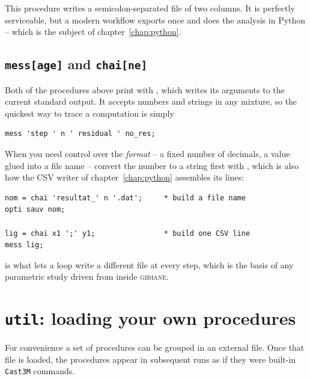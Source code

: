 \noindent This procedure writes a semicolon-separated file of two columns.
It is perfectly serviceable, but a modern workflow exports once and does the
analysis in Python -- which is the subject of chapter~\ref{chap:python}.

\subsection{\texttt{mess[age]} and \texttt{chai[ne]}}

Both of the procedures above print with 
, which writes its arguments
to the current standard output. It accepts numbers and strings in any mixture,
so the quickest way to trace a computation is simply

\begin{codebox}
\begin{verbatim}
mess 'step ' n ' residual ' no_res;
\end{verbatim}
\end{codebox}

\noindent When you need control over the \emph{format} -- a fixed number of
decimals, a value glued into a file name -- convert the number to a string
first with  , which
is also how the CSV writer of chapter~\ref{chap:python} assembles its lines:

\begin{codebox}
\begin{verbatim}
nom = chai 'resultat_' n '.dat';     * build a file name
opti sauv nom;

lig = chai x1 ';' y1;                * build one CSV line
mess lig;
\end{verbatim}
\end{codebox}

\noindent {} is what lets a loop write a different file at every step,
which is the basis of any parametric study driven from inside
\textsc{gibiane}.

\section{\texttt{util}: loading your own procedures}

For convenience a set of procedures can be grouped in an external file. Once
that file is loaded, the procedures appear in subsequent runs as if they were
built-in \texttt{Cast3M} commands.

